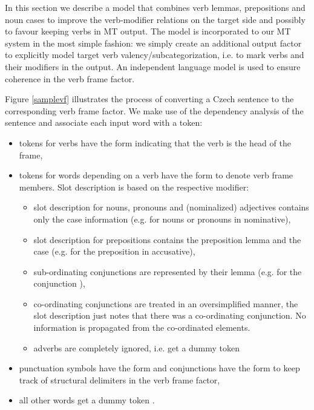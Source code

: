 \documentclass[11pt]{book}
\theoremstyle{plain}
\begin{document}


In this section we describe a model that combines verb lemmas, prepositions and
noun cases to improve the verb-modifier relations on the target side and
possibly to favour keeping verbs in MT output. The model
is incorporated to our MT system in the most simple fashion: we simply create an
additional output factor to explicitly model target verb
valency/subcategorization, i.e. to mark verbs and their modifiers in the output.
An independent language model is used to ensure coherence in the verb frame
factor.

Figure \ref{samplevf} illustrates the process of converting a Czech sentence to
the corresponding verb frame factor. We make use of the dependency analysis of
the sentence and associate each input word with a token:

\begin{itemize}

\item tokens for verbs have the form  indicating that the verb is the head of the frame,

\item tokens for words depending on a verb have the form  to denote verb frame members. Slot description is based on the
  respective modifier:
\begin{itemize}

\item slot description for nouns, pronouns and (nominalized) adjectives contains
  only the case information (e.g.  for nouns or pronouns in
  nominative),

\item slot description for prepositions contains the preposition lemma and the
  case (e.g.  for the preposition  in accusative),

\item sub-ordinating conjunctions are represented by their lemma (e.g.
   for the conjunction ),

\item co-ordinating conjunctions are treated in an oversimplified manner, the slot
  description just notes that there was a co-ordinating conjunction. No
  information is propagated from the co-ordinated elements.

\item adverbs are completely ignored, i.e. get a dummy token \text{---}
\end{itemize}

\item punctuation symbols have the form  and
  conjunctions have the form  to
  keep track of structural delimiters in the verb frame factor,

\item all other words get a dummy token \text{---}.
\end{itemize}
\end{document}
